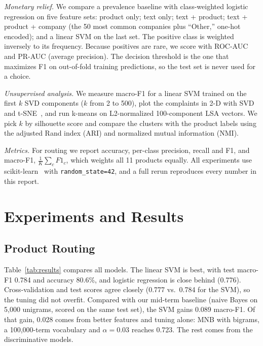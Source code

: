 \documentclass[conference]{IEEEtran}
\begin{document}
\textit{Monetary relief.} We compare a prevalence baseline with class-weighted logistic regression on five feature sets: product only; text only; text + product; text + product + company (the 50 most common companies plus ``Other,'' one-hot encoded); and a linear SVM on the last set. The positive class is weighted inversely to its frequency. Because positives are rare, we score with ROC-AUC and PR-AUC (average precision). The decision threshold is the one that maximizes F1 on out-of-fold training predictions, so the test set is never used for a choice.

\textit{Unsupervised analysis.} We measure macro-F1 for a linear SVM trained on the first $k$ SVD components ($k$ from 2 to 500), plot the complaints in 2-D with SVD and t-SNE~\cite{tsne}, and run k-means on L2-normalized 100-component LSA vectors. We pick $k$ by silhouette score and compare the clusters with the product labels using the adjusted Rand index (ARI) and normalized mutual information (NMI).

\textit{Metrics.} For routing we report accuracy, per-class precision, recall and F1, and macro-F1, $\frac{1}{K}\sum_{c} F1_c$, which weights all 11 products equally. All experiments use scikit-learn~\cite{sklearn} with \texttt{random\_state=42}, and a full rerun reproduces every number in this report.

\section{Experiments and Results}

\subsection{Product Routing}
Table~\ref{tab:results} compares all models. The linear SVM is best, with test macro-F1 0.784 and accuracy 80.6\%, and logistic regression is close behind (0.776). Cross-validation and test scores agree closely (0.777 vs.\ 0.784 for the SVM), so the tuning did not overfit. Compared with our mid-term baseline (naive Bayes on 5,000 unigrams, scored on the same test set), the SVM gains 0.089 macro-F1. Of that gain, 0.028 comes from better features and tuning alone: MNB with bigrams, a 100,000-term vocabulary and $\alpha=0.03$ reaches 0.723. The rest comes from the discriminative models.
\end{document}
